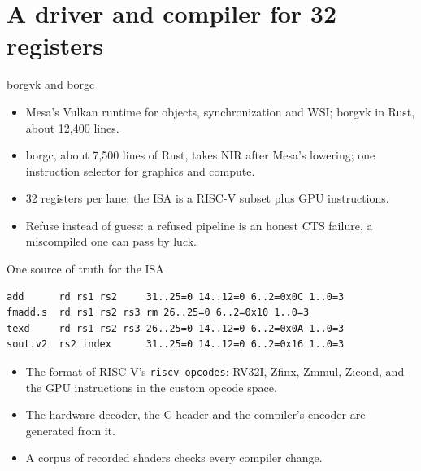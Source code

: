 \documentclass[aspectratio=169,11pt]{beamer}
\begin{document}
\section{A driver and compiler for 32 registers}

\begin{frame}{borgvk and borgc}
  \begin{itemize}
    \item Mesa's Vulkan runtime for objects, synchronization and WSI; borgvk in Rust,
      about 12,400 lines.
    \item borgc, about 7,500 lines of Rust, takes NIR after Mesa's lowering; one instruction selector
      for graphics and compute.
    \item 32 registers per lane; the ISA is a RISC-V subset plus GPU instructions.
    \item Refuse instead of guess: a refused pipeline is an honest CTS failure, a miscompiled one
      can pass by luck.
  \end{itemize}
\end{frame}

\begin{frame}[fragile]{One source of truth for the ISA}
  \small
\begin{verbatim}
add      rd rs1 rs2     31..25=0 14..12=0 6..2=0x0C 1..0=3
fmadd.s  rd rs1 rs2 rs3 rm 26..25=0 6..2=0x10 1..0=3
texd     rd rs1 rs2 rs3 26..25=0 14..12=0 6..2=0x0A 1..0=3
sout.v2  rs2 index      31..25=0 14..12=0 6..2=0x16 1..0=3
\end{verbatim}
  \normalsize
  \begin{itemize}
    \item The format of RISC-V's \texttt{riscv-opcodes}: RV32I, Zfinx, Zmmul, Zicond, and the GPU
      instructions in the custom opcode space.
    \item The hardware decoder, the C header and the compiler's encoder are generated from it.
    \item A corpus of recorded shaders checks every compiler change.
  \end{itemize}
\end{frame}
\end{document}
